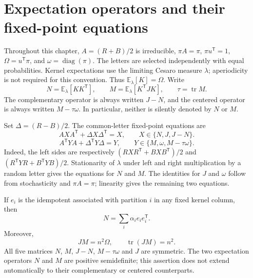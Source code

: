 
\section{Expectation operators and their fixed-point equations}
\label{sec:6.3}

Throughout this chapter, $A=(R+B)/2$ is irreducible, $\pi A=\pi$,
$\pi u^{\mathsf T}=1$, $\Omega=u^{\mathsf T}\pi$, and
$\omega=\operatorname{diag}(\pi)$. The letters are selected independently
with equal probabilities. Kernel expectations use the limiting Cesaro
measure $\lambda$; aperiodicity is not required for this convention.
Thus $\mathbb E_\lambda[K]=\Omega$. Write
\[
 N=\mathbb E_\lambda[KK^{\mathsf T}],\qquad
 M=\mathbb E_\lambda[K^{\mathsf T}JK],\qquad
 \tau=\operatorname{tr}M.
\]
The complementary operator is always written $J-N$, and the centered
operator is always written $M-\tau\omega$. In particular, neither is
silently denoted by $N$ or $M$.

Set $\Delta=(R-B)/2$. The common-letter fixed-point equations are
\begin{equation}\label{eq:N}
 AXA^{\mathsf T}+\Delta X\Delta^{\mathsf T}=X,
 \qquad X\in\{N,J,J-N\}.
\end{equation}
\begin{equation}\label{eq:M}
 A^{\mathsf T}YA+\Delta^{\mathsf T}Y\Delta=Y,
 \qquad Y\in\{M,\omega,M-\tau\omega\}.
\end{equation}
Indeed, the left sides are respectively
$(RXR^{\mathsf T}+BXB^{\mathsf T})/2$ and
$(R^{\mathsf T}YR+B^{\mathsf T}YB)/2$.
Stationarity of $\lambda$ under left and right multiplication by a random
letter gives the equations for $N$ and $M$. The identities for $J$ and
$\omega$ follow from stochasticity and $\pi A=\pi$; linearity gives
the remaining two equations.

If $e_i$ is the idempotent associated with partition $i$ in any fixed
kernel column, then
\[
 N=\sum_i\alpha_i e_i e_i^{\mathsf T}.
\]
Moreover,
\[
 JM=n^2\Omega,\qquad \operatorname{tr}(JM)=n^2.
\]
All five matrices $N$, $M$, $J-N$, $M-\tau\omega$ and $J$ are symmetric.
The two expectation operators $N$ and $M$ are positive semidefinite;
this assertion does not extend automatically to their complementary
or centered counterparts.
